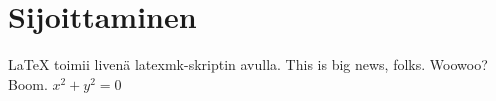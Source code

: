 \documentclass{article}
\begin{document}
 
\section*{Sijoittaminen}

\LaTeX{} toimii livenä latexmk-skriptin avulla.
This is big news, folks. Woowoo? Boom. $x^2 + y^2 = 0$
\end{document}

